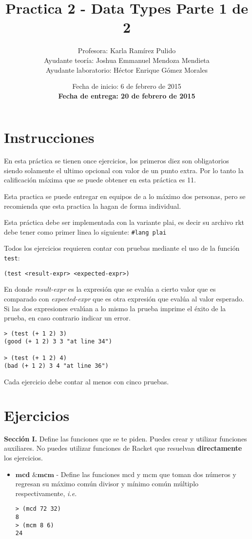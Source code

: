 \documentclass{article}
\author{Profesora: Karla Ramírez Pulido\\
  Ayudante teoría: Joshua Emmanuel Mendoza Mendieta\\
  Ayudante laboratorio: Héctor Enrique Gómez Morales}
\title{Practica 2 - Data Types Parte 1 de 2}
\date{Fecha de inicio: 6 de febrero de 2015\\
  \textbf{Fecha de entrega: 20 de febrero de 2015}}
\begin{document}
\maketitle
\section{Instrucciones}
En esta práctica se tienen once ejercicios, los primeros diez son
obligatorios siendo solamente el ultimo opcional con valor de un punto
extra. Por lo tanto la calificación máxima que se puede obtener en
esta práctica es 11.

Esta practica se puede entregar en equipos de a lo máximo dos
personas, pero se recomienda que esta practica la hagan de forma
individual.

Esta práctica debe ser implementada con la variante plai, es decir
su archivo rkt debe tener como primer linea lo siguiente:
\texttt{\#lang plai}

Todos los ejercicios requieren contar con pruebas mediante el uso de
la función \texttt{test}:
\begin{verbatim}
(test <result-expr> <expected-expr>)
\end{verbatim}

En donde \textit{result-expr} es la expresión que se evalúa a cierto
valor que es comparado con \textit{expected-expr} que es otra
expresión que evalúa al valor esperado. Si las dos expresiones evalúan
a lo mismo la prueba imprime el éxito de la prueba, en caso contrario
indicar un error.

\begin{verbatim}
> (test (+ 1 2) 3)
(good (+ 1 2) 3 3 "at line 34")

> (test (+ 1 2) 4)
(bad (+ 1 2) 3 4 "at line 36")
\end{verbatim}

Cada ejercicio debe contar al menos con cinco pruebas.

\section{Ejercicios}
\textbf{Sección I.} Define las funciones que se te piden. Puedes crear y utilizar
funciones auxiliares. No puedes utilizar funciones de Racket que
resuelvan \textbf{directamente} los ejercicios.
\begin{itemize}
\item $\textbf{mcd \& mcm}$ - Define las funciones mcd y mcm que
  toman dos números y regresan su máximo común divisor y mínimo común
  múltiplo respectivamente, \textit{i.e.}
\begin{verbatim}
> (mcd 72 32)
8
> (mcm 8 6)
24
\end{verbatim}

\newpage

\end{itemize}
\end{document}

